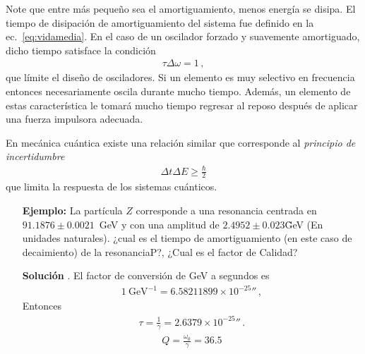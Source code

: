 Note que entre más pequeño sea el amortiguamiento, menos energía se disipa. El tiempo de disipación de amortiguamiento del sistema  fue definido en la ec.~\eqref{eq:vidamedia}. En el caso de un oscilador forzado y suavemente amortiguado, dicho tiempo satisface la condición
\begin{align*}
  \tau \Delta \omega =1\,,
\end{align*}
que límite el diseño de osciladores. Si un elemento es muy selectivo en frecuencia entonces necesariamente oscila durante mucho tiempo. Además,  un elemento de estas característica le tomará mucho tiempo regresar al reposo después de aplicar una fuerza impulsora adecuada. 

En mecánica cuántica existe una relación similar que corresponde al \emph{principio de incertidumbre}
\begin{align*}
  \Delta t \Delta E\ge \frac{\hbar}{2}
\end{align*}
que limita la respuesta de los sistemas cuánticos. 

\begin{itemize}
\item[\textbf{Ejemplo:}] La partícula $Z$ corresponde a una resonancia centrada en $91.1876\pm 0.0021$~GeV y con una amplitud de $2.4952\pm0.023$\~GeV (En unidades naturales). ¿cual es el tiempo de amortiguamiento (en este caso de decaimiento) de la resonanciaP?, ¿Cual es el factor de Calidad? 

\item[\textbf{Solución}]. El factor de conversión de GeV  a segundos es
  \begin{align*}
    1\ \text{GeV}^{-1}=6.58211899\times 10^{-25}\second\,,
  \end{align*}
  Entonces
  \begin{align*}
    \tau=\frac{1}{\gamma}=2.6379\times10^{-25}\second\,.
  \end{align*}
  \begin{align*}
    Q=\frac{\omega_0}{\gamma}=36.5
  \end{align*}
\end{itemize}


